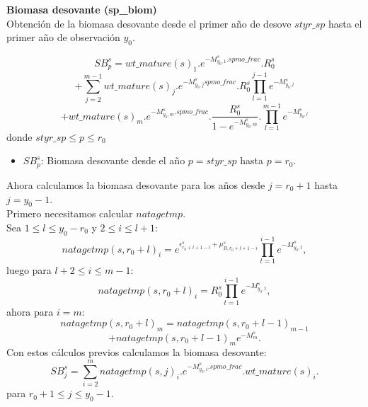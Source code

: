 \documentclass{article}
\begin{document}
\textbf{Biomasa desovante (sp\_biom)}\\
Obtención de la biomasa desovante desde el primer año de desove $styr\_sp$ hasta el primer año de observación $y_0$.

\begin{equation}
    SB^s_p=wt\_mature(s)_1.e^{-M^s_{y_0,1}.spmo\_frac}.R^s_0
\end{equation}
\begin{equation*}
    +\sum_{j=2}^{m-1}wt\_mature(s)_j.e^{-M^s_{y_0,j} spmo\_frac}.R^s_0\prod_{l=1}^{j-1}e^{-M^s_{y_0,l}} 
\end{equation*}
\begin{equation*}
    + wt\_mature(s)_{m}.e^{-M^s_{y_0,m}.spmo\_frac}.\dfrac{R^s_0}{1-e^{-M^s_{y_0,m}}}.\prod_{l=1}^{m-1}e^{-M^s_{y_0,l}}
\end{equation*}
donde $styr\_sp\leq p \leq r_0$
\begin{itemize}
   \item $SB^s_p$: Biomasa desovante desde el año $p=styr\_sp$ hasta $p=r_0$.
\end{itemize}

Ahora calculamos la biomasa desovante para los años desde $j=r_0+1$ hasta $j=y_0-1$.\\
Primero necesitamos calcular $natagetmp$.\\
Sea $1\leq l \leq y_0-r_0$ y $2\leq i \leq l+1$:
\begin{equation}
natagetmp(s,r_0+l)_i = e^{\epsilon^s_{r_0+l+1-i}+\mu^s_{R,r_0+l+1-i}}\prod_{t=1}^{i-1}e^{-M^s_{y_0,t}},
\end{equation}
luego para $l+2\leq  i \leq m-1$:
\begin{equation}
natagetmp(s,r_0+l)_i=R^s_0\prod_{t=1}^{i-1}e^{-M^s_{y_0,t}},
\end{equation}
ahora para $i=m$:
\begin{equation}
natagetmp(s,r_0+l)_{m}=natagetmp(s,r_0+l-1)_{m-1}
\end{equation}
\begin{equation*}
    +natagetmp(s,r_0+l-1)_{m}e^{-M^s_{m}}.
\end{equation*}
Con estos cálculos previos calculamos la biomasa desovante:
\begin{equation}
    SB^s_j=\sum_{i=2}^{m}natagetmp(s,j)_i.e^{-M^s_{y_0,i}.spmo\_frac}.wt\_mature(s)_i.
\end{equation}
para $r_0 +1 \leq j \leq y_0-1$. \\
\end{document}
